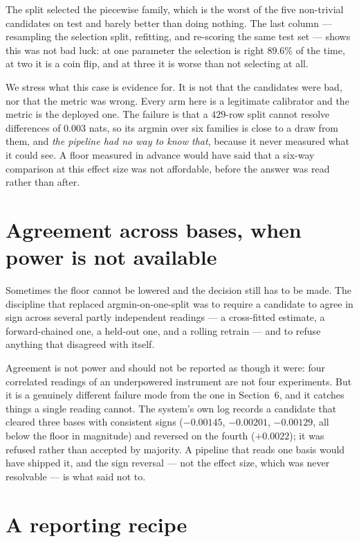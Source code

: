 \documentclass{article}
\begin{document}
The split selected the piecewise family, which is the worst of the five non-trivial candidates on test and barely better than doing nothing. The last column --- resampling the selection split, refitting, and re-scoring the same test set --- shows this was not bad luck: at one parameter the selection is right $89.6\%$ of the time, at two it is a coin flip, and at three it is worse than not selecting at all.

We stress what this case is evidence for. It is not that the candidates were bad, nor that the metric was wrong. Every arm here is a legitimate calibrator and the metric is the deployed one. The failure is that a $429$-row split cannot resolve differences of $0.003$ nats, so its argmin over six families is close to a draw from them, and \emph{the pipeline had no way to know that}, because it never measured what it could see. A floor measured in advance would have said that a six-way comparison at this effect size was not affordable, before the answer was read rather than after.

\section{Agreement across bases, when power is not available}

Sometimes the floor cannot be lowered and the decision still has to be made. The discipline that replaced argmin-on-one-split was to require a candidate to agree in sign across several partly independent readings --- a cross-fitted estimate, a forward-chained one, a held-out one, and a rolling retrain --- and to refuse anything that disagreed with itself.

Agreement is not power and should not be reported as though it were: four correlated readings of an underpowered instrument are not four experiments. But it is a genuinely different failure mode from the one in Section~6, and it catches things a single reading cannot. The system's own log records a candidate that cleared three bases with consistent signs ($-0.00145$, $-0.00201$, $-0.00129$, all below the floor in magnitude) and reversed on the fourth ($+0.0022$); it was refused rather than accepted by majority. A pipeline that reads one basis would have shipped it, and the sign reversal --- not the effect size, which was never resolvable --- is what said not to.

\section{A reporting recipe}
\end{document}
